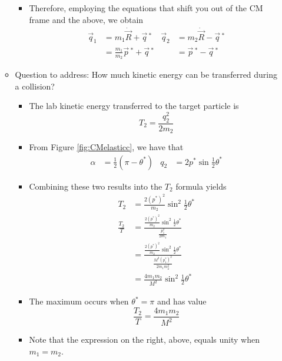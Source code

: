 \documentclass[../notes.tex]{subfiles}
\begin{document}
\begin{itemize}
\begin{itemize}
\begin{itemize}
\begin{equation*}
            \end{equation*}
            \item Therefore, employing the equations that shift you out of the CM frame and the above, we obtain
            \begin{align*}
                \vec{q}_1 &= m_1\dot{\vec{R}}+\vec{q}{\,}^*&
                    \vec{q}_2 &= m_2\dot{\vec{R}}-\vec{q}{\,}^*\\
                &= \frac{m_1}{m_2}\vec{p}{\,}^*+\vec{q}{\,}^*&
                    &= \vec{p}{\,}^*-\vec{q}{\,}^*
            \end{align*}
        \end{itemize}
        \item Question to address: How much kinetic energy can be transferred during a collision?
        \begin{itemize}
            \item The lab kinetic energy transferred to the target particle is
            \begin{equation*}
                T_2 = \frac{q_2^2}{2m_2}
            \end{equation*}
            \item From Figure \ref{fig:CMelasticc}, we have that
            \begin{align*}
                \alpha &= \frac{1}{2}(\pi-\theta^*)&
                q_2 &= 2p^*\sin\frac{1}{2}\theta^*
            \end{align*}
            \item Combining these two results into the $T_2$ formula yields
            \begin{align*}
                T_2 &= \frac{2(p^*)^2}{m_2}\sin^2\frac{1}{2}\theta^*\\
                \frac{T_2}{T} &= \frac{\frac{2(p^*)^2}{m_2}\sin^2\frac{1}{2}\theta^*}{\frac{p_1^2}{2m_1}}\\
                &= \frac{\frac{2(p^*)^2}{m_2}\sin^2\frac{1}{2}\theta^*}{\frac{M^2(p_1^*)^2}{2m_1m_2^2}}\\
                &= \frac{4m_1m_2}{M^2}\sin^2\frac{1}{2}\theta^*
            \end{align*}
            \item The maximum occurs when $\theta^*=\pi$ and has value
            \begin{equation*}
                \frac{T_2}{T} = \frac{4m_1m_2}{M^2}
            \end{equation*}
            \item Note that the expression on the right, above, equals unity when $m_1=m_2$.

\end{itemize}
\end{itemize}
\end{itemize}
\end{document}
